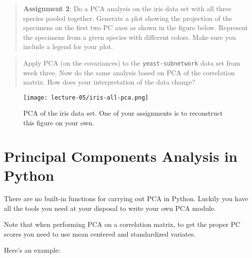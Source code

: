 \documentclass{article}
\makeatletter
\def\maxwidth{
    \ifdim\Gin@nat@width > 3.5in 
        3.5in
    \else\Gin@nat@width
    \fi}
\let\Oldincludegraphics\includegraphics
\renewcommand{\includegraphics}[1]{\Oldincludegraphics[width=\maxwidth]{#1}}
\makeatother
\begin{document}
\begin{quote}
\textbf{Assignment 2}: Do a PCA analysis on the iris data set with all
three species pooled together. Generate a plot showing the projection of
the specimens on the first two PC axes as shown in the figure below.
Represent the specimens from a given species with different colors. Make
sure you include a legend for your plot.

\end{quote}
\begin{quote}
Apply PCA (on the covariances) to the \lstinline!yeast-subnetwork! data
set from week three. Now do the same analysis based on PCA of the
correlation matrix. How does your interpretation of the data change?

\end{quote}
\begin{figure}[htbp]
\centering
\texttt{[image: lecture-05/iris-all-pca.png]}
\caption{PCA of the iris data set. One of your assignments is to
reconstruct this figure on your own.}
\end{figure}

\section{Principal Components Analysis in Python}

There are no built-in functions for carrying out PCA in Python. Luckily
you have all the tools you need at your disposal to write your own PCA
module.

Note that when performing PCA on a correlation matrix, to get the proper
PC scores you need to use mean centered and standardized variates.

Here's an example:
\end{document}
